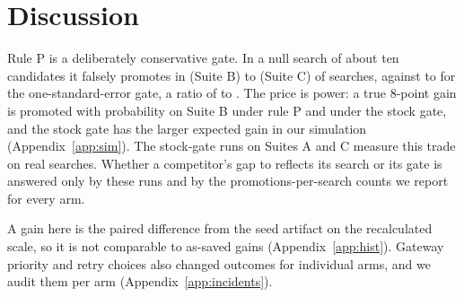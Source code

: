 \section{Discussion}
\label{sec:discussion}

Rule P is a deliberately conservative gate. In a null search of about ten candidates it falsely promotes in \simPFalseB{} (Suite B) to \simPFalseC{} (Suite C) of searches, against \simKoneFalseB{} to \simKoneFalseA{} for the one-standard-error gate, a ratio of \simRatioLo{} to \simRatioHi{}. The price is power: a true 8-point gain is promoted with probability \simPPowerEightB{} on Suite B under rule P and \simKonePowerEightB{} under the stock gate, and the stock gate has the larger expected gain in our simulation (Appendix~\ref{app:sim}). The stock-gate runs on Suites A and C measure this trade on real searches.  Whether a competitor's gap to \capevolve{} reflects its search or its gate is answered only by these runs and by the promotions-per-search counts we report for every arm.

A gain here is the paired difference from the seed artifact on the recalculated scale, so it is not comparable to as-saved gains (Appendix~\ref{app:hist}). Gateway priority and retry choices also changed outcomes for individual arms, and we audit them per arm (Appendix~\ref{app:incidents}).
